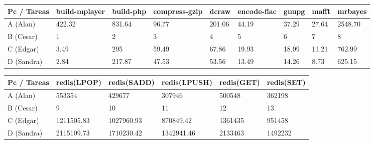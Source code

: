 \documentclass{article}
\begin{document}
     
\begin{table}[]
\begin{tabular}{@{}|l|l|l|l|l|l|l|l|l|@{}}
\toprule
Pc / Tareas & build-mplayer & build-php & compress-gzip & dcraw  & encode-flac & gnupg & mafft & mrbayes \\ \midrule
A (Alan)    & 422.32        & 831.64    & 96.77         & 201.06 & 44.19       & 37.29 & 27.64 & 2548.70 \\ \midrule
B (Cesar)   & 1             & 2         & 3             & 4      & 5           & 6     & 7     & 8       \\ \midrule
C (Edgar)   & 3.49          & 295       & 59.49         & 67.86  & 19.93       & 18.99 & 11.21 & 762.99  \\ \midrule
D (Sandra)  & 2.84          & 217.87    & 47.53         & 53.56  & 13.49       & 14.26 & 8.73  & 625.15  \\ \bottomrule
\end{tabular}
\end{table}
    
		    
\begin{table}[]
\begin{tabular}{@{}|l|l|l|l|l|l|@{}}
\toprule
Pc / Tareas & redis(LPOP) & redis(SADD) & redis(LPUSH) & redis(GET) & redis(SET) \\ \midrule
\multicolumn{1}{|l|}{A (Alan)}    & 553354      & 429677      & 307946       & 500548     & 362198     \\ \midrule
\multicolumn{1}{|l|}{B (Cesar)}  & 9           & 10          & 11           & 12         & 13         \\ \midrule
\multicolumn{1}{|l|}{C (Edgar)}  & 1211505.83  & 1027960.93  & 870849.42    & 1361435    & 951458     \\ \midrule
\multicolumn{1}{|l|}{D (Sandra)} & 2115109.73  & 1710230.42  & 1342941.46   & 2133463    & 1492232    \\ \bottomrule
\end{tabular}
\end{table}
	
\end{document}
